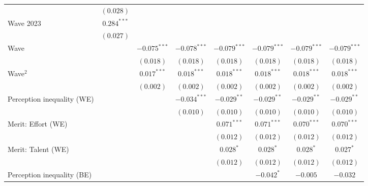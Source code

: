 \documentclass[
  12pt,
]{article}
\begin{document}
\begin{table}
{\begin{center}
{\begin{tabular}{l c c c c c c c}
                                     & $(0.028)$      &                &                &                &                &                &                \\
\quad Wave 2023                      & $0.284^{***}$  &                &                &                &                &                &                \\
                                     & $(0.027)$      &                &                &                &                &                &                \\
Wave                                 &                & $-0.075^{***}$ & $-0.078^{***}$ & $-0.079^{***}$ & $-0.079^{***}$ & $-0.079^{***}$ & $-0.079^{***}$ \\
                                     &                & $(0.018)$      & $(0.018)$      & $(0.018)$      & $(0.018)$      & $(0.018)$      & $(0.018)$      \\
Wave$^2$                             &                & $0.017^{***}$  & $0.018^{***}$  & $0.018^{***}$  & $0.018^{***}$  & $0.018^{***}$  & $0.018^{***}$  \\
                                     &                & $(0.002)$      & $(0.002)$      & $(0.002)$      & $(0.002)$      & $(0.002)$      & $(0.002)$      \\
Perception inequality (WE)           &                &                & $-0.034^{***}$ & $-0.029^{**}$  & $-0.029^{**}$  & $-0.029^{**}$  & $-0.029^{**}$  \\
                                     &                &                & $(0.010)$      & $(0.010)$      & $(0.010)$      & $(0.010)$      & $(0.010)$      \\
Merit: Effort (WE)                   &                &                &                & $0.071^{***}$  & $0.071^{***}$  & $0.070^{***}$  & $0.070^{***}$  \\
                                     &                &                &                & $(0.012)$      & $(0.012)$      & $(0.012)$      & $(0.012)$      \\
Merit: Talent (WE)                   &                &                &                & $0.028^{*}$    & $0.028^{*}$    & $0.028^{*}$    & $0.027^{*}$    \\
                                     &                &                &                & $(0.012)$      & $(0.012)$      & $(0.012)$      & $(0.012)$      \\
Perception inequality (BE)           &                &                &                &                & $-0.042^{*}$   & $-0.005$       & $-0.032$       \\

\end{tabular}}
\end{center}}
\end{table}
\end{document}
